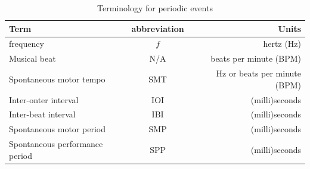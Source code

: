\documentclass{report}
\begin{document}
\begin{table}
    \begin{center}
      \caption{Terminology for periodic events}
      \label{tab:t3_1}
      \begin{tabular}{l|c|r}
        \textbf{Term} & \textbf{abbreviation} & \textbf{Units}\\
        \hline
        frequency & $f$ & hertz (Hz)\\
        \hline
        Musical beat & N/A & beats per minute (BPM)\\
        \hline
        Spontaneous motor tempo & SMT & Hz or beats per minute (BPM)\\
        \hline
        Inter-onter interval & IOI & (milli)seconds\\
        \hline
        Inter-beat interval & IBI & (milli)seconds\\
        \hline
        Spontaneous motor period & SMP & (milli)seconds\\
        \hline
        Spontaneous performance period & SPP & (milli)seconds\\
      \end{tabular}
    \end{center}   
\end{table}
\end{document}
